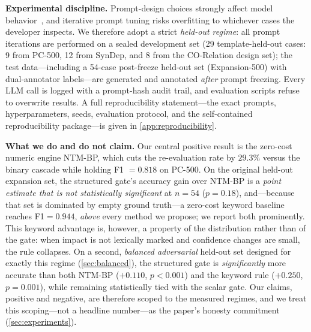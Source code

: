 \documentclass{article}
\theoremstyle{definition}
\begin{document}
\textbf{Experimental discipline.} Prompt-design choices strongly affect
model behavior~\cite{sclar2024prompt}, and iterative prompt tuning risks
overfitting to whichever cases the developer inspects. We therefore adopt
a strict \emph{held-out regime}:
all prompt iterations are performed on a sealed development set
(29 template-held-out cases: 9 from PC-500, 12 from SynDep, and 8 from
the CO-Relation design set); the test data---including a 54-case
post-freeze held-out set (Expansion-500) with dual-annotator labels---are
generated and annotated \emph{after} prompt freezing. Every LLM call is
logged with a prompt-hash audit trail, and evaluation scripts refuse to
overwrite results.  A full reproducibility statement---the exact
prompts, hyperparameters, seeds, evaluation protocol, and the
self-contained reproducibility package---is given in
\cref{app:reproducibility}.

\textbf{What we do and do not claim.}  Our central positive result is
the zero-cost numeric engine NTM-BP, which cuts the re-evaluation rate
by $29.3\%$ versus the binary cascade while holding F1 $=0.818$ on PC-500.
On the original held-out expansion set, the structured gate's accuracy
gain over NTM-BP is a \emph{point estimate that is not statistically
significant} at $n=54$ ($p=0.18$), and---because that set is dominated by
empty ground truth---a zero-cost keyword baseline reaches F1$=0.944$,
\emph{above} every method we propose; we report both prominently.  This
keyword advantage is, however, a property of the distribution rather
than of the gate: when impact is not lexically marked and confidence
changes are small, the rule collapses.  On a second, \emph{balanced
adversarial} held-out set designed for exactly this regime
(\cref{sec:balanced}), the structured gate is \emph{significantly} more
accurate than both NTM-BP ($+0.110$, $p<0.001$) and the keyword rule
($+0.250$, $p=0.001$), while remaining statistically tied with the
scalar gate.  Our claims, positive and negative, are therefore scoped to
the measured regimes, and we treat this scoping---not a headline
number---as the paper's honesty commitment (\cref{sec:experiments}).
\end{document}
